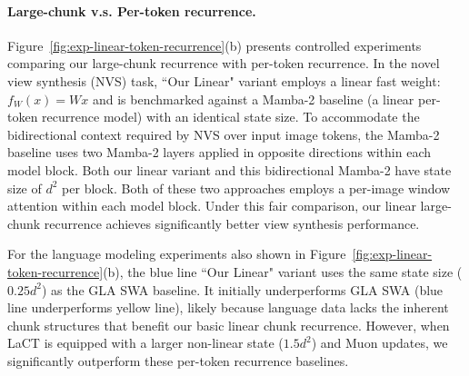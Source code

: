 \paragraph{Large-chunk v.s. Per-token recurrence.} 
Figure~\ref{fig:exp-linear-token-recurrence}(b) presents controlled experiments comparing our large-chunk recurrence with per-token recurrence. 
In the novel view synthesis (NVS) task, ``Our Linear" variant employs a linear fast weight: $f_W(x) = Wx$ and is benchmarked against a Mamba-2 baseline (a linear per-token recurrence model) with an identical state size. To accommodate the bidirectional context required by NVS over input image tokens, the Mamba-2 baseline uses two Mamba-2 layers applied in opposite directions within each model block. Both our linear variant and this bidirectional Mamba-2 have state size of $d^2$ per block. Both of these two approaches employs a per-image window attention within each model block. Under this fair comparison, our linear large-chunk recurrence achieves significantly better view synthesis performance.

For the language modeling experiments also shown in Figure~\ref{fig:exp-linear-token-recurrence}(b), the blue line ``Our Linear" variant uses the same state size ($0.25 d^2$) as the GLA SWA baseline. It initially underperforms GLA SWA (blue line underperforms yellow line),  likely because language data lacks the inherent chunk structures that benefit our basic linear chunk recurrence. However, when LaCT is equipped with a larger non-linear state ($1.5d^2$) and Muon updates, we significantly outperform these per-token recurrence baselines.

